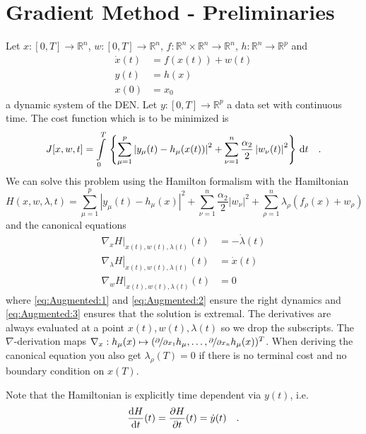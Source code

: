 \section{Gradient Method - Preliminaries}
Let $x:[0,T]\to \mathbb{R}^n$, $w:[0,T]\to \mathbb{R}^n$, $f:\mathbb{R}^n\times 
\mathbb{R}^n \to \mathbb{R}^n$, $h:\mathbb{R}^n \to \mathbb{R}^p$ and 
\begin{align}
\dot{x}(t) &= f(x(t)) + w(t)\\
y(t) &= h(x) \\
x(0) &= x_0
\end{align}
a dynamic system of the DEN. Let $y:[0,T]\to \mathbb{R}^p$ a data set with continuous 
time. The cost function which is to be minimized is
\begin{equation}
J[x,w,t] = \int\limits_0^T \, \left\{
\sum\limits_{\mu=1}^p \left|y_\mu(t)-h_\mu(x(t))\right|^2 +\sum\limits_{\nu=1}^n 
\frac{\alpha_2}{2} \left|w_\nu(t)\right|^2 
\right\} \, \text{d} t  \quad .
\end{equation}
We can solve this problem using the Hamilton formalism with the Hamiltonian
\begin{equation}
H(x,w,\lambda,t) = \sum\limits_{\mu=1}^p \left|y_\mu(t)-h_\mu(x)\right|^2 +\sum\limits_{\nu=1}^n 
\frac{\alpha_2}{2} \left|w_\nu\right|^2
+ \sum\limits_{\rho=1}^n \lambda_\rho (f_\rho(x)+w_\rho)
  \label{eq:Augmented:Hamiltonian}
\end{equation}
and the canonical equations
\begin{align}
\left. \nabla_x H \right|_{x(t),w(t),\lambda(t)}(t) &= - \dot{\lambda}(t)
\label{eq:Augmented:1}\\
\left. \nabla_\lambda H\right|_{x(t),w(t),\lambda(t)}(t) &= \dot{x}(t) 
\label{eq:Augmented:2} \\
\left. \nabla_w H \right|_{x(t),w(t),\lambda(t)}(t) & =0
\label{eq:Augmented:3}
\end{align}
where \eqref{eq:Augmented:1} and \eqref{eq:Augmented:2} ensure the right dynamics and 
\eqref{eq:Augmented:3} ensures that the solution is extremal. The derivatives are always
evaluated at a point $x(t),w(t),\lambda(t)$ so we drop the subscripts. The 
$\nabla$-derivation maps $\nabla_x:h_\mu(x) \mapsto (\nicefrac{\partial}{\partial x_1} h_\mu ,\ldots,\nicefrac{\partial}{\partial x_n}h_\mu(x))^T$. When deriving 
the canonical equation you also get $\lambda_\rho(T)=0$ if there is no terminal cost 
and no boundary condition on $x(T)$.

\begin{remark}
Note that the 
Hamiltonian is explicitly time dependent via $y(t)$, i.e.
\begin{equation}
\frac{\text{d}  H}{\text{d} t}(t) = 
\frac{\partial H}{\partial t}(t) = \dot{y}(t) \quad . \label{eq:H_t}
\end{equation}
\end{remark}

